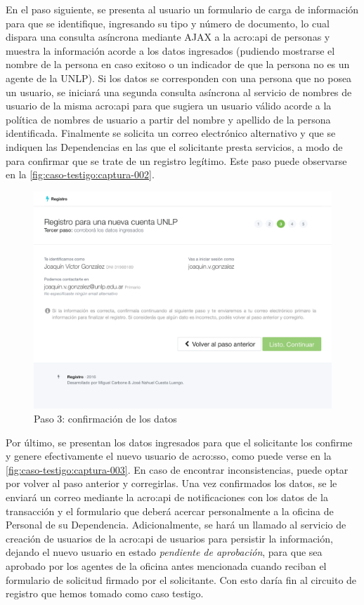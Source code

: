En el paso siguiente, se presenta al usuario un formulario de carga de información para que se identifique, ingresando su tipo y número de documento, lo cual dispara una consulta asíncrona mediante AJAX a la \gls{acro:api} de personas y muestra la información acorde a los datos ingresados (pudiendo mostrarse el nombre de la persona en caso exitoso o un indicador de que la persona no es un agente de la UNLP). Si los datos se corresponden con una persona que no posea un usuario, se iniciará una segunda consulta asíncrona al servicio de nombres de usuario de la misma \gls{acro:api} para que sugiera un usuario válido acorde a la política de nombres de usuario a partir del nombre y apellido de la persona identificada. Finalmente se solicita un correo electrónico alternativo y que se indiquen las Dependencias en las que el solicitante presta servicios, a modo de  para confirmar que se trate de un registro legítimo. Este paso puede observarse en la \autoref{fig:caso-testigo:captura-002}.

\begin{figure}
  \centering
  \includegraphics[width=\textwidth,keepaspectratio]{src/images/05-capitulo-5/capturas/page_003.png}
  \caption{Paso 3: confirmación de los datos}
  \label{fig:caso-testigo:captura-003}
\end{figure}

Por último, se presentan los datos ingresados para que el solicitante los confirme y genere efectivamente el nuevo usuario de \gls{acro:sso}, como puede verse en la \autoref{fig:caso-testigo:captura-003}. En caso de encontrar inconsistencias, puede optar por volver al paso anterior y corregirlas. Una vez confirmados los datos, se le enviará un correo mediante la \gls{acro:api} de notificaciones con los datos de la transacción y el formulario que deberá acercar personalmente a la oficina de Personal de su Dependencia. Adicionalmente, se hará un llamado al servicio de creación de usuarios de la \gls{acro:api} de usuarios para persistir la información, dejando el nuevo usuario en estado \textit{pendiente de aprobación}, para que sea aprobado por los agentes de la oficina antes mencionada cuando reciban el formulario de solicitud firmado por el solicitante. Con esto daría fin al circuito de registro que hemos tomado como caso testigo.
